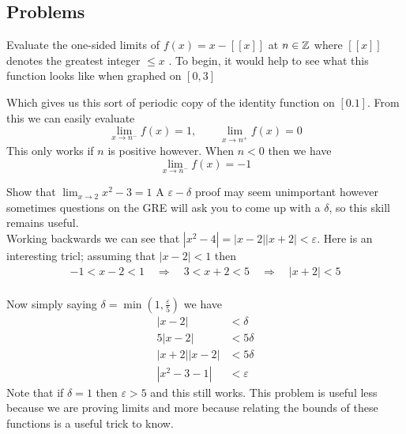 \subsection{Problems}
\begin{problem}{1}{Evaluate the one-sided limits of $f(x) = x - [[x]]$ at $n \in \mathbb{Z}$ where $[[x]]$ denotes the greatest integer $\le x$ \cite{Stewart}.}
	To begin, it would help to see what this function looks like when graphed on $[0,3]$
	\\
	\begin{center}
	\end{center}

	Which gives us this sort of periodic copy of the identity function on $[0.1]$. From this we can easily evaluate 
	$$\lim_{x \to n^{-}} f(x) = 1, \qquad \lim_{x \to n^{+}} f(x) = 0$$ This only works if $n$ is positive however. When $n < 0$ then we have $$\lim_{x \to n^{-}} f(x) = -1$$
\end{problem}

\begin{problem}{2}{Show that $\lim_{x\to 2} x^2 - 3 =1$}
A $\varepsilon-\delta$ proof may seem unimportant however sometimes questions on the GRE will ask you to come up with a $\delta$, so this skill remains useful.\\

Working backwards we can see that $|x^2 - 4| = |x-2||x+2| < \varepsilon$. Here is an interesting tricl; assuming that $|x-2| < 1$ then
\begin{align*}
	-1 < x -2 < 1 \quad\Rightarrow \quad3 < x + 2 < 5 \quad\Rightarrow \quad |x+2| < 5\\
\end{align*}

Now simply saying $\delta = \min\left(1, \frac{\varepsilon}{5}\right)$ we have
\begin{align*}
	|x-2| &< \delta \\ 
	5|x-2| &< 5\delta\\
	|x+2||x-2| &< 5\delta\\
	|x^2 - 3 - 1| &< \varepsilon
\end{align*}
Note that if $\delta = 1$ then $\varepsilon > 5$ and this still works. This problem is useful less because we are proving limits and more because
relating the bounds of these functions is a useful trick to know. 
\end{problem}


